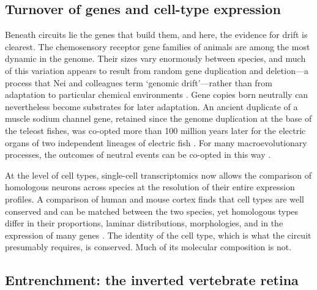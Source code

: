 \documentclass[twocolumn]{article}
\begin{document}
\subsection{Turnover of genes and cell-type expression}

Beneath circuits lie the genes that build them, and here, the evidence for drift is clearest. The chemosensory receptor gene families of animals are among the most dynamic in the genome. Their sizes vary enormously between species, and much of this variation appears to result from random gene duplication and deletion---a process that Nei and colleagues term `genomic drift'---rather than from adaptation to particular chemical environments \cite{Nei_Niimura_2008}. Gene copies born neutrally can nevertheless become substrates for later adaptation. An ancient duplicate of a muscle sodium channel gene, retained since the genome duplication at the base of the teleost fishes, was co-opted more than 100 million years later for the electric organs of two independent lineages of electric fish \cite{Arnegard_Zwickl_2010}. For many macroevolutionary processes, the outcomes of neutral events can be co-opted in this way \cite{Lynch_2007, bruckner_2021, kebschull_luo_2020}.

At the level of cell types, single-cell transcriptomics now allows the comparison of homologous neurons across species at the resolution of their entire expression profiles. A comparison of human and mouse cortex finds that cell types are well conserved and can be matched between the two species, yet homologous types differ in their proportions, laminar distributions, morphologies, and in the expression of many genes \cite{Hodge_Bakken_2019}. The identity of the cell type, which is what the circuit presumably requires, is conserved. Much of its molecular composition is not.

\subsection{Entrenchment: the inverted vertebrate retina}
\end{document}

